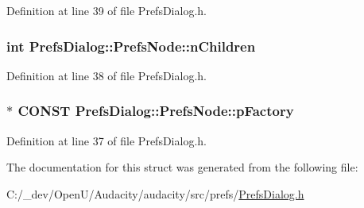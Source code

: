 Definition at line 39 of file Prefs\+Dialog.\+h.

\subsubsection[{\texorpdfstring{n\+Children}{nChildren}}]{ {\bf int} Prefs\+Dialog\+::\+Prefs\+Node\+::n\+Children}\hypertarget{struct_prefs_dialog_1_1_prefs_node_ad71edd162a476dc376c40b79bdf8f7c6}{}\label{struct_prefs_dialog_1_1_prefs_node_ad71edd162a476dc376c40b79bdf8f7c6}


Definition at line 38 of file Prefs\+Dialog.\+h.

\subsubsection[{\texorpdfstring{p\+Factory}{pFactory}}]{$\ast$ {\bf C\+O\+N\+ST} Prefs\+Dialog\+::\+Prefs\+Node\+::p\+Factory}\hypertarget{struct_prefs_dialog_1_1_prefs_node_ac8777f7c94379a77fe7d05a655f5594e}{}\label{struct_prefs_dialog_1_1_prefs_node_ac8777f7c94379a77fe7d05a655f5594e}


Definition at line 37 of file Prefs\+Dialog.\+h.



The documentation for this struct was generated from the following file\+:\begin{DoxyCompactItemize}
\item 
C\+:/\+\_\+dev/\+Open\+U/\+Audacity/audacity/src/prefs/\hyperlink{_prefs_dialog_8h}{Prefs\+Dialog.\+h}\end{DoxyCompactItemize}
